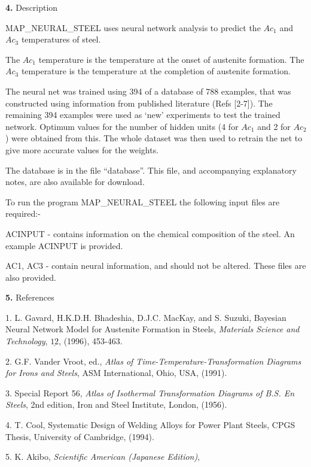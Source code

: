 \rm
{}
\item{\bf 4.} {\largeb  Description}
\bigskip
\item {} MAP\_NEURAL\_STEEL uses neural network analysis to predict the
$Ac_1$ and $Ac_3$ temperatures of steel. 
\medskip
\item {} The $Ac_1$ temperature is the temperature at the onset of austenite 
formation. The $Ac_3$ temperature is the temperature at the completion of 
austenite formation.
\medskip
\item {} The neural net was trained using 394 of a database of 788 examples,
that was constructed using information from published literature (Refs [2-7]).
The remaining 394 examples were used as `new' experiments to test the
trained network.
Optimum values for the number of hidden units (4 for $Ac_1$ and 2 for $Ac_2$)
were obtained from this. The whole dataset was then used to retrain the
net to give more accurate values for the weights.
\medskip
\item {} The database is in the file ``database''. This file, and accompanying explanatory notes, are also available for download.
\bigskip
\item {} To run the program MAP\_NEURAL\_STEEL the following input files
are required:-
\medskip
\item {} ACINPUT  - contains information on the chemical composition of the 
steel. An example ACINPUT is provided.
\medskip
\item {} AC1, AC3 -  contain neural information, and should not be altered.  These files are also provided.
\vfill \eject
\item{\bf 5.} {\largeb  References}
\bigskip
\item {} 1. L. Gavard, H.K.D.H. Bhadeshia, D.J.C. MacKay, and S. Suzuki,
 Bayesian Neural Network Model for Austenite Formation in Steels,
{\it Materials Science and Technology}, {$\underline {12}$}, (1996), 453-463.
\medskip
\item {} 2. G.F. Vander Vroot, ed., {\it Atlas of 
Time-Temperature-Transformation Diagrams for Irons and Steels}, ASM 
International, Ohio, USA, (1991).
\medskip
\item {} 3. Special Report 56, {\it Atlas of Isothermal Transformation
Diagrams of B.S. En Steels}, 2nd edition, Iron and Steel Institute, London,
(1956).
\medskip
\item {} 4. T. Cool, Systematic Design of Welding Alloys for Power Plant
Steels, CPGS Thesis, University of Cambridge, (1994).
\medskip
\item {} 5. K. Akibo, {\it Scientific American (Japanese Edition)},
